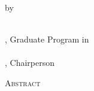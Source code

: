 \clearpage
\centering
\vspace*{-\toptafiddle}

\thetitle{} \\
by \\
\theauthor{} \\

\vfill

\thedegree, Graduate Program in \thefield{} \\
\theuniversity{} \\
\thechair{}, Chairperson \\
\thedate{}

\vfill

\textsc{Abstract}

\justify{}

\enlargethispage{\bottafiddle}
\clearpage
